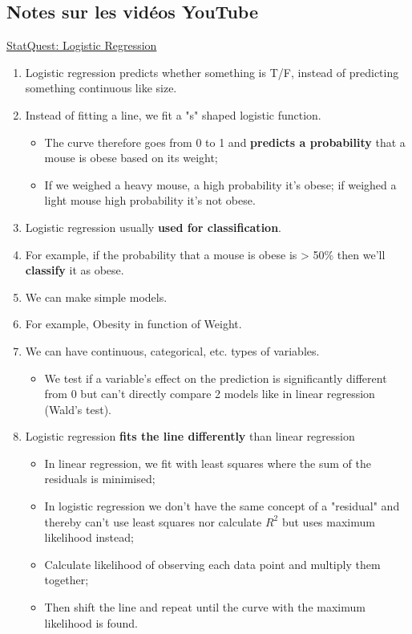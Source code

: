 \documentclass[12pt, titlepage, french]{report}
\begin{document}
\subsection{Notes sur les vidéos YouTube}

\begin{YTB_SUMM}{\href{https://www.youtube.com/watch?v=yIYKR4sgzI8}{StatQuest: Logistic Regression}}
\begin{enumerate}
	\item	Logistic regression predicts whether something is T/F, instead of predicting something continuous like size.
	\item	Instead of fitting a line, we fit a "s" shaped logistic function.
	\begin{itemize}
		\item	The curve therefore goes from 0 to 1 and \textbf{predicts a probability} that a mouse is obese based on its weight;
		\item	If we weighed a heavy mouse, a high probability it's obese; if weighed a light mouse high probability it's not obese.
	\end{itemize}
	\item	Logistic regression usually \textbf{used for classification}.
	\item[]	For example, if the probability that a mouse is obese is > 50\% then we'll \textbf{classify} it as obese.
	\item	We can make simple models. 
	\item[]	For example, Obesity in function of Weight.
	\item	We can have continuous, categorical, etc. types of variables.
	\begin{itemize}
		\item	We test if a variable's effect on the prediction is significantly different from 0 but can't directly compare 2 models like in linear regression (Wald's test).
	\end{itemize}
	\item	Logistic regression \textbf{fits the line differently} than linear regression
	\begin{itemize}
		\item	In linear regression, we fit with least squares where the sum of the residuals is minimised;
		\item	In logistic regression we don't have the same concept of a "residual" and thereby can't use least squares nor calculate $R^{2}$ but uses maximum likelihood instead;
		\item	Calculate likelihood of observing each data point and multiply them together;
		\item	Then shift the line and repeat until the curve with the maximum likelihood is found.
	\end{itemize}
\end{enumerate}
\end{YTB_SUMM}
\end{document}

